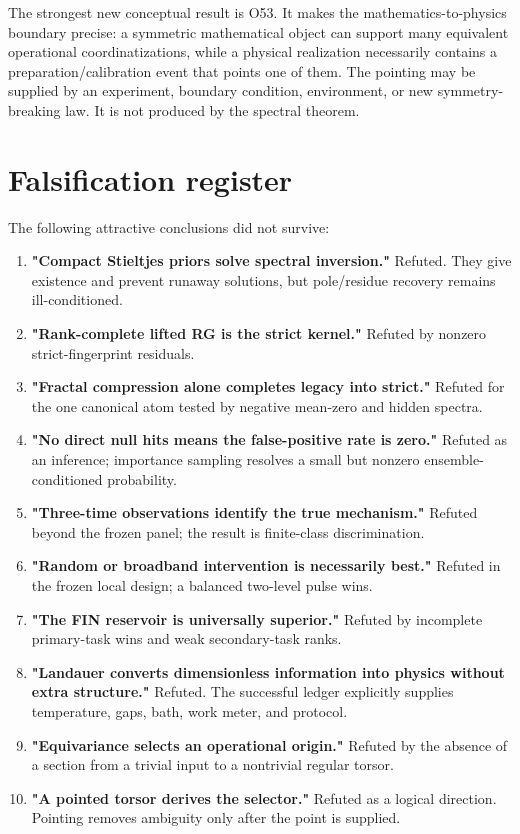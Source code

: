\documentclass[11pt,a4paper,openany]{report}
\begin{document}
The strongest new conceptual result is O53. It makes the mathematics-to-physics boundary precise: a symmetric mathematical object can support many equivalent operational coordinatizations, while a physical realization necessarily contains a preparation/\allowbreak{}calibration event that points one of them. The pointing may be supplied by an experiment, boundary condition, environment, or new symmetry-breaking law. It is not produced by the spectral theorem.

\chapter{Falsification register}

The following attractive conclusions did not survive:

\begin{enumerate}
\item 
\textbf{"Compact Stieltjes priors solve spectral inversion."} Refuted. They give existence and prevent runaway solutions, but pole/\allowbreak{}residue recovery remains ill-conditioned.

\item 
\textbf{"Rank-complete lifted RG is the strict kernel."} Refuted by nonzero strict-fingerprint residuals.

\item 
\textbf{"Fractal compression alone completes legacy into strict."} Refuted for the one canonical atom tested by negative mean-zero and hidden spectra.

\item 
\textbf{"No direct null hits means the false-positive rate is zero."} Refuted as an inference; importance sampling resolves a small but nonzero ensemble-conditioned probability.

\item 
\textbf{"Three-time observations identify the true mechanism."} Refuted beyond the frozen panel; the result is finite-class discrimination.

\item 
\textbf{"Random or broadband intervention is necessarily best."} Refuted in the frozen local design; a balanced two-level pulse wins.

\item 
\textbf{"The FIN reservoir is universally superior."} Refuted by incomplete primary-task wins and weak secondary-task ranks.

\item 
\textbf{"Landauer converts dimensionless information into physics without extra structure."} Refuted. The successful ledger explicitly supplies temperature, gaps, bath, work meter, and protocol.

\item 
\textbf{"Equivariance selects an operational origin."} Refuted by the absence of a section from a trivial input to a nontrivial regular torsor.

\item 
\textbf{"A pointed torsor derives the selector."} Refuted as a logical direction. Pointing removes ambiguity only after the point is supplied.

\end{enumerate}
\end{document}

